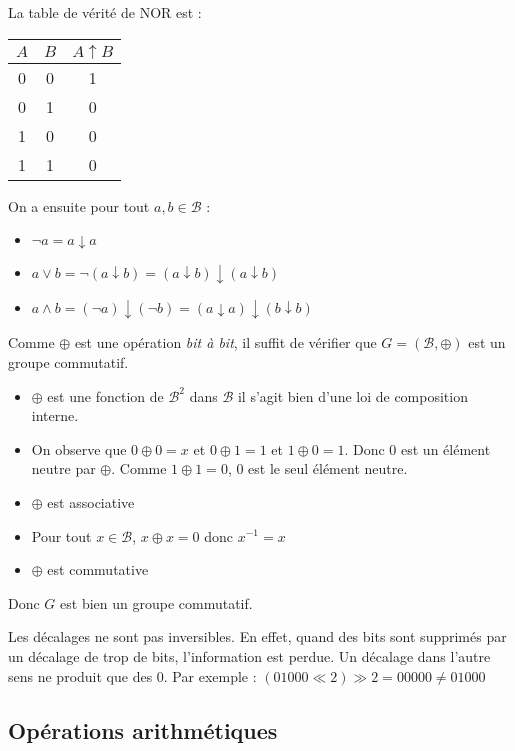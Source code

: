 \documentclass[../main.tex]{subfiles}
\begin{document}
La table de vérité de NOR est :
\begin{center}
\begin{tabular}{c|c|c}
$A$ & $B$ & $A\uparrow{B}$ \\
\hline
0 & 0 & 1 \\
0 & 1 & 0 \\
1 & 0 & 0 \\
1 & 1 & 0 \\
\end{tabular}
\end{center}
On a ensuite pour tout $a, b\in{\mathcal{B}}$ :
\begin{itemize}
	\item $\neg a = a\downarrow a$
	\item $a \vee b = \neg{(a \downarrow b)} = (a\downarrow b) \downarrow (a\downarrow b)$
	\item $a\wedge b = (\neg a)\downarrow (\neg b) = (a\downarrow a) \downarrow (b\downarrow b)$
\end{itemize}
 Comme $\oplus$ est une opération \textit{bit à bit}, il suffit de vérifier que $G = (\mathcal{B}, \oplus)$ est un groupe commutatif.
\begin{itemize}
	\item $\oplus$ est une fonction de $\mathcal{B}^{2}$ dans $\mathcal{B}$ il s'agit bien d'une loi de composition interne.
	\item On observe que $0\oplus0 = x$ et $0\oplus 1 = 1$ et $1\oplus 0 = 1$. Donc $0$ est un élément neutre par $\oplus$. Comme $1\oplus1 = 0$, 0 est le seul élément neutre.
	\item $\oplus$ est associative
	\item Pour tout $x\in{\mathcal{B}}$, $x\oplus x = 0$ donc $x^{-1} = x$
	\item $\oplus$ est commutative
\end{itemize}
Donc $G$ est bien un groupe commutatif.

 Les décalages ne sont pas inversibles. En effet, quand des bits sont supprimés par un décalage de trop de bits, l'information est perdue. Un décalage dans l'autre sens ne produit que des 0. Par exemple : $(01000 \ll 2) \gg 2 = 00000 \neq 01000$
\subsection{Opérations arithmétiques}
\end{document}
